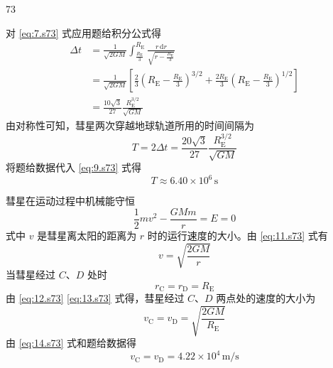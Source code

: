 \begin{solution}{73}
\begin{subsolution}
\begin{equation}
            \label{eq:7.s73}
        \end{equation}
        对 \eqref{eq:7.s73} 式应用题给积分公式得
        \begin{align}
            \Delta t &= \frac{1}{\sqrt{2 G M}} \int_{\frac{R_{\mathrm{E}}}{3}}^{R_{\mathrm{E}}} \frac{r \,\mathrm{d} r}{\sqrt{r - \frac{R_{\mathrm{E}}}{3}}} \nonumber \\
            &= \frac{1}{\sqrt{2 G M}} \left[ \frac{2}{3} \left(R_{\mathrm{E}} - \frac{R_{\mathrm{E}}}{3}\right)^{3/2} + \frac{2 R_{\mathrm{E}}}{3} \left(R_{\mathrm{E}} - \frac{R_{\mathrm{E}}}{3}\right)^{1/2} \right] \nonumber \\
            &= \frac{10 \sqrt{3}}{27} \frac{R_{\mathrm{E}}^{3/2}}{\sqrt{G M}}
            \label{eq:8.s73}
        \end{align}
        由对称性可知，彗星两次穿越地球轨道所用的时间间隔为
        \begin{equation}
            T = 2 \Delta t = \frac{20 \sqrt{3}}{27} \frac{R_{\mathrm{E}}^{3/2}}{\sqrt{G M}}
            \label{eq:9.s73}
        \end{equation}
        将题给数据代入 \eqref{eq:9.s73} 式得
        \begin{equation}
            T \approx 6.40 \times 10^{6}\,\mathrm{s}
            \label{eq:10.s73}
        \end{equation}
    \end{subsolution}
    \begin{subsolution}
        彗星在运动过程中机械能守恒
        \begin{equation}
            \frac{1}{2} m v^{2} - \frac{G M m}{r} = E = 0
            \label{eq:11.s73}
        \end{equation}
        式中 $v$ 是彗星离太阳的距离为 $r$ 时的运行速度的大小。由 \eqref{eq:11.s73} 式有
        \begin{equation}
            v = \sqrt{\frac{2 G M}{r}}
            \label{eq:12.s73}
        \end{equation}
        当彗星经过 $C$、$D$ 处时
        \begin{equation}
            r_{\mathrm{C}} = r_{\mathrm{D}} = R_{\mathrm{E}}
            \label{eq:13.s73}
        \end{equation}
        由 \eqref{eq:12.s73} \eqref{eq:13.s73} 式得，彗星经过 $C$、$D$ 两点处的速度的大小为
        \begin{equation}
            v_{\mathrm{C}} = v_{\mathrm{D}} = \sqrt{\frac{2 G M}{R_{\mathrm{E}}}}
            \label{eq:14.s73}
        \end{equation}
        由 \eqref{eq:14.s73} 式和题给数据得
        \begin{equation}
            v_{\mathrm{C}} = v_{\mathrm{D}} = 4.22 \times 10^{4}\,\mathrm{m/s}
            \label{eq:15.s73}
        \end{equation}
    \end{subsolution}
\end{solution}